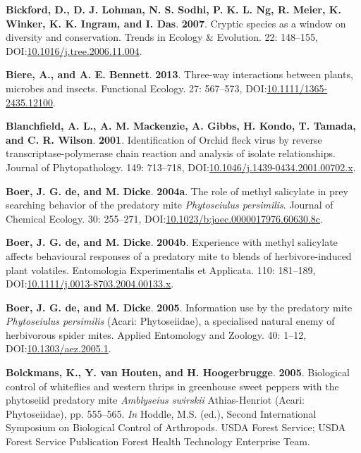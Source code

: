 \documentclass[12pt,final,CPage]{ufthesis}
\newlength{\cslhangindent}
\newenvironment{CSLReferences}[2] %
{%
	\setlength{\parindent}{0pt}
	\ifodd #1 \everypar{\setlength{\hangindent}{\cslhangindent}}\ignorespaces\fi
	\ifnum #2 > 0
	\setlength{\parskip}{#2\baselineskip}
	\fi
}%
{}
\begin{document}
{\begin{CSLReferences}{1}{0}
  \leavevmode{}%
  \textbf{Bickford, D., D. J. Lohman, N. S. Sodhi, P. K. L. Ng, R. Meier, K. Winker, K. K. Ingram, and I. Das}. \textbf{2007}. Cryptic species as a window on diversity and conservation. Trends in Ecology {\&} Evolution. 22: 148--155, DOI:\href{https://doi.org/10.1016/j.tree.2006.11.004}{10.1016/j.tree.2006.11.004}.

  \leavevmode{}%
  \textbf{Biere, A., and A. E. Bennett}. \textbf{2013}. Three-way interactions between plants, microbes and insects. Functional Ecology. 27: 567--573, DOI:\href{https://doi.org/10.1111/1365-2435.12100}{10.1111/1365-2435.12100}.

  \leavevmode{}%
  \textbf{Blanchfield, A. L., A. M. Mackenzie, A. Gibbs, H. Kondo, T. Tamada, and C. R. Wilson}. \textbf{2001}. Identification of {Orchid fleck virus} by reverse transcriptase-polymerase chain reaction and analysis of isolate relationships. Journal of Phytopathology. 149: 713--718, DOI:\href{https://doi.org/10.1046/j.1439-0434.2001.00702.x}{10.1046/j.1439-0434.2001.00702.x}.

  \leavevmode{}%
  \textbf{Boer, J. G. de, and M. Dicke}. \textbf{2004a}. The role of methyl salicylate in prey searching behavior of the predatory mite {\emph{Phytoseiulus persimilis}}. Journal of Chemical Ecology. 30: 255--271, DOI:\href{https://doi.org/10.1023/b:joec.0000017976.60630.8c}{10.1023/b:joec.0000017976.60630.8c}.

  \leavevmode{}%
  \textbf{Boer, J. G. de, and M. Dicke}. \textbf{2004b}. Experience with methyl salicylate affects behavioural responses of a predatory mite to blends of herbivore-induced plant volatiles. Entomologia Experimentalis et Applicata. 110: 181--189, DOI:\href{https://doi.org/10.1111/j.0013-8703.2004.00133.x}{10.1111/j.0013-8703.2004.00133.x}.

  \leavevmode{}%
  \textbf{Boer, J. G. de, and M. Dicke}. \textbf{2005}. Information use by the predatory mite {\emph{Phytoseiulus persimilis}} {({Acari}: {Phytoseiidae})}, a specialised natural enemy of herbivorous spider mites. Applied Entomology and Zoology. 40: 1--12, DOI:\href{https://doi.org/10.1303/aez.2005.1}{10.1303/aez.2005.1}.

  \leavevmode{}%
  \textbf{Bolckmans, K., Y. van Houten, and H. Hoogerbrugge}. \textbf{2005}. Biological control of whiteflies and western thrips in greenhouse sweet peppers with the phytoseiid predatory mite {\emph{Amblyseius swirskii}} {Athias-Henriot} ({Acari}: {Phytoseiidae}), pp. 555--565. \emph{In} Hoddle, M.S. (ed.), Second International Symposium on Biological Control of Arthropods. USDA Forest Service; USDA Forest Service Publication Forest Health Technology Enterprise Team.


\end{CSLReferences}}
\end{document}

